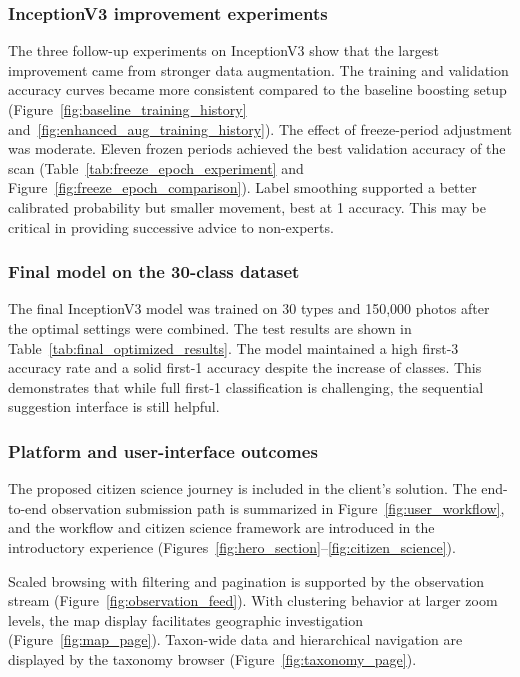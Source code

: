 \subsubsection{InceptionV3 improvement experiments}

The three follow-up experiments on InceptionV3 show that the largest improvement came from 
stronger data augmentation. The training and validation accuracy curves became more consistent 
compared to the baseline boosting setup (Figure~\ref{fig:baseline_training_history} 
and~\ref{fig:enhanced_aug_training_history}). The effect of freeze-period adjustment was moderate.  
Eleven frozen periods achieved the best validation accuracy of the scan 
(Table~\ref{tab:freeze_epoch_experiment} and Figure~\ref{fig:freeze_epoch_comparison}). Label 
smoothing supported a better calibrated probability but smaller movement, best at 1 accuracy. 
This may be critical in providing successive advice to non-experts.

\subsubsection{Final model on the 30-class dataset}

The final InceptionV3 model was trained on 30 types and 150,000 photos after the optimal settings 
were combined. The test results are shown in Table~\ref{tab:final_optimized_results}. The model maintained a high first-3 
accuracy rate and a solid first-1 accuracy despite the increase of classes. This demonstrates 
that while full first-1 classification is challenging, the sequential suggestion interface is 
still helpful.

\subsubsection{Platform and user-interface outcomes}

The proposed citizen science journey is included in the client's solution. The end-to-end 
observation submission path is summarized in Figure~\ref{fig:user_workflow}, and the workflow and citizen 
science framework are introduced in the introductory experience (Figures~\ref{fig:hero_section}--\ref{fig:citizen_science}).

Scaled browsing with filtering and pagination is supported by the observation stream 
(Figure~\ref{fig:observation_feed}). With clustering behavior at larger zoom levels, 
the map display facilitates geographic investigation (Figure~\ref{fig:map_page}). 
Taxon-wide data and hierarchical navigation are displayed by the taxonomy browser 
(Figure~\ref{fig:taxonomy_page}).

